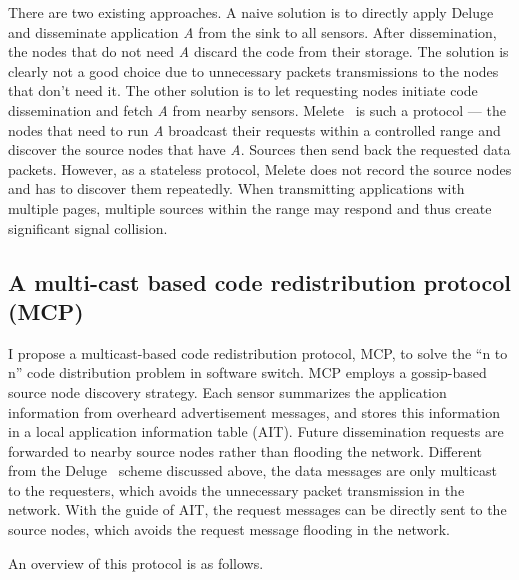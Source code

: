There are two existing approaches. A naive solution is to directly apply Deluge and disseminate application {\it A} 
from the sink to all sensors. After dissemination, the nodes that do not need {\it A} discard the code from their 
storage. The solution is clearly not a good choice due to unnecessary packets transmissions to the nodes that don't 
need it. The other solution is to let requesting nodes initiate code dissemination and fetch {\it A} from nearby 
sensors. Melete~\cite{melete} is such a protocol --- the nodes that need to run {\it A} broadcast their requests within 
a controlled range and discover the source nodes that have {\it A}. Sources then send back the requested data packets. 
However, as a stateless protocol, Melete does not record the source nodes and has to discover them repeatedly. When 
transmitting applications with multiple pages, multiple sources within the range may respond and thus create 
significant signal collision. 


\subsection{A multi-cast based code redistribution protocol (MCP)}


I propose a multicast-based code redistribution protocol,  MCP, to solve the ``n to n'' code distribution problem in 
software switch. MCP employs a gossip-based source node discovery strategy. Each sensor summarizes the application 
information from overheard advertisement messages, and stores this information in a local application information table 
(AIT). Future dissemination requests are forwarded to nearby source nodes rather than flooding the network.
Different from the Deluge~\cite{deluge} scheme discussed above, the data messages are only multicast to the requesters, 
which avoids the unnecessary packet transmission in the network. With the guide of AIT, the request messages can be 
directly sent to the source nodes, which avoids the request message flooding in the network.  

An overview of this protocol is as follows.

